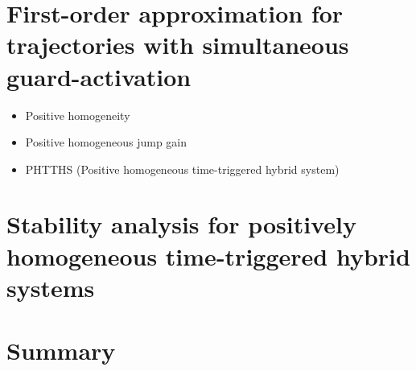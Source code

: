 \documentclass[../DC2017114Bouma.tex]{subfiles}
\begin{document}
\section{First-order approximation for trajectories with simultaneous guard-activation}
\begin{itemize}
\item Positive homogeneity
\item Positive homogeneous jump gain
\item PHTTHS (Positive homogeneous time-triggered hybrid system)
\end{itemize}
%
%
%
%
%
%
\section{Stability analysis for positively homogeneous time-triggered hybrid systems}

\section{Summary}
\end{document}
